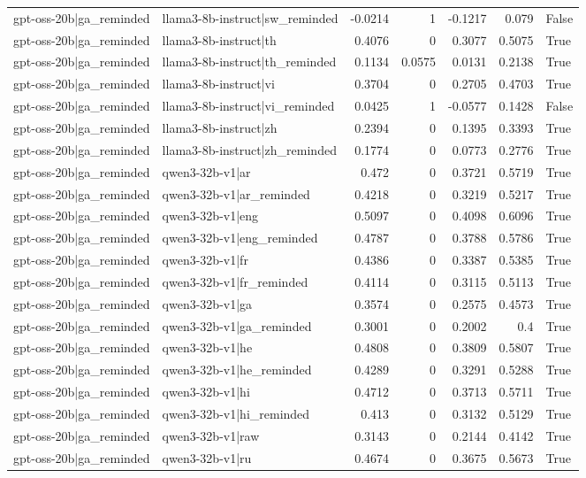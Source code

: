 \begin{table}
\begin{tabular}{l l r r r r l}
gpt-oss-20b|ga_reminded & llama3-8b-instruct|sw_reminded & -0.0214 & 1 & -0.1217 & 0.079 & False \\
gpt-oss-20b|ga_reminded & llama3-8b-instruct|th & 0.4076 & 0 & 0.3077 & 0.5075 & True \\
gpt-oss-20b|ga_reminded & llama3-8b-instruct|th_reminded & 0.1134 & 0.0575 & 0.0131 & 0.2138 & True \\
gpt-oss-20b|ga_reminded & llama3-8b-instruct|vi & 0.3704 & 0 & 0.2705 & 0.4703 & True \\
gpt-oss-20b|ga_reminded & llama3-8b-instruct|vi_reminded & 0.0425 & 1 & -0.0577 & 0.1428 & False \\
gpt-oss-20b|ga_reminded & llama3-8b-instruct|zh & 0.2394 & 0 & 0.1395 & 0.3393 & True \\
gpt-oss-20b|ga_reminded & llama3-8b-instruct|zh_reminded & 0.1774 & 0 & 0.0773 & 0.2776 & True \\
gpt-oss-20b|ga_reminded & qwen3-32b-v1|ar & 0.472 & 0 & 0.3721 & 0.5719 & True \\
gpt-oss-20b|ga_reminded & qwen3-32b-v1|ar_reminded & 0.4218 & 0 & 0.3219 & 0.5217 & True \\
gpt-oss-20b|ga_reminded & qwen3-32b-v1|eng & 0.5097 & 0 & 0.4098 & 0.6096 & True \\
gpt-oss-20b|ga_reminded & qwen3-32b-v1|eng_reminded & 0.4787 & 0 & 0.3788 & 0.5786 & True \\
gpt-oss-20b|ga_reminded & qwen3-32b-v1|fr & 0.4386 & 0 & 0.3387 & 0.5385 & True \\
gpt-oss-20b|ga_reminded & qwen3-32b-v1|fr_reminded & 0.4114 & 0 & 0.3115 & 0.5113 & True \\
gpt-oss-20b|ga_reminded & qwen3-32b-v1|ga & 0.3574 & 0 & 0.2575 & 0.4573 & True \\
gpt-oss-20b|ga_reminded & qwen3-32b-v1|ga_reminded & 0.3001 & 0 & 0.2002 & 0.4 & True \\
gpt-oss-20b|ga_reminded & qwen3-32b-v1|he & 0.4808 & 0 & 0.3809 & 0.5807 & True \\
gpt-oss-20b|ga_reminded & qwen3-32b-v1|he_reminded & 0.4289 & 0 & 0.3291 & 0.5288 & True \\
gpt-oss-20b|ga_reminded & qwen3-32b-v1|hi & 0.4712 & 0 & 0.3713 & 0.5711 & True \\
gpt-oss-20b|ga_reminded & qwen3-32b-v1|hi_reminded & 0.413 & 0 & 0.3132 & 0.5129 & True \\
gpt-oss-20b|ga_reminded & qwen3-32b-v1|raw & 0.3143 & 0 & 0.2144 & 0.4142 & True \\
gpt-oss-20b|ga_reminded & qwen3-32b-v1|ru & 0.4674 & 0 & 0.3675 & 0.5673 & True \\

\end{tabular}
\end{table}
